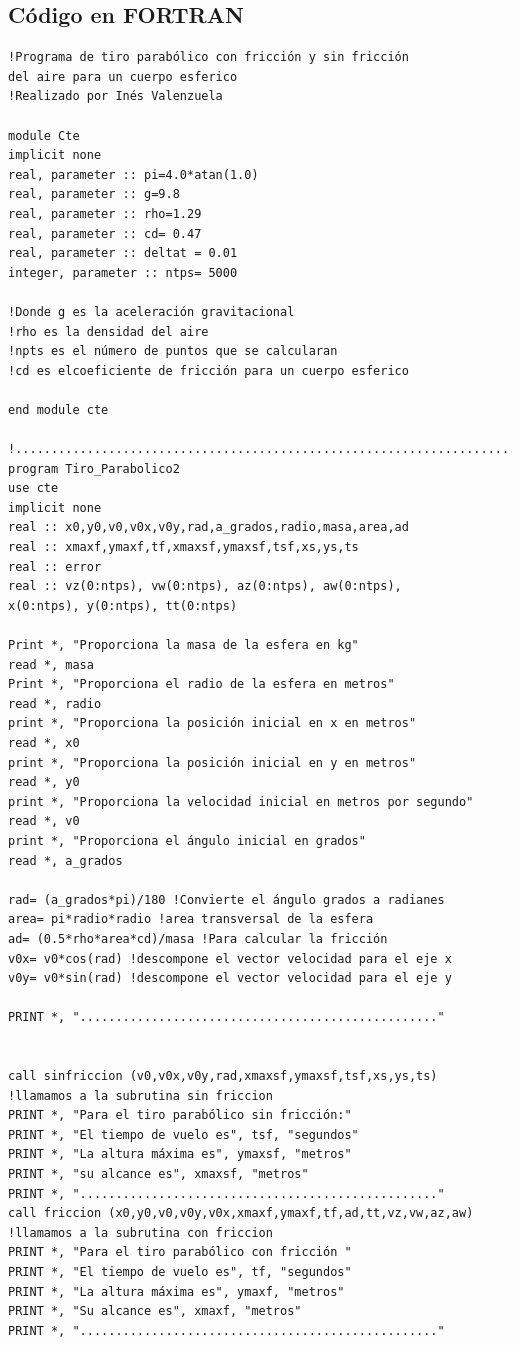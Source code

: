 \documentclass[a4paper]{article}
\begin{document}
\subsection{Código en FORTRAN}

\begin{verbatim}
!Programa de tiro parabólico con fricción y sin fricción 
del aire para un cuerpo esferico
!Realizado por Inés Valenzuela

module Cte
implicit none
real, parameter :: pi=4.0*atan(1.0)
real, parameter :: g=9.8
real, parameter :: rho=1.29
real, parameter :: cd= 0.47
real, parameter :: deltat = 0.01
integer, parameter :: ntps= 5000

!Donde g es la aceleración gravitacional
!rho es la densidad del aire
!npts es el número de puntos que se calcularan
!cd es elcoeficiente de fricción para un cuerpo esferico

end module cte

!..............................................................................
program Tiro_Parabolico2
use cte
implicit none
real :: x0,y0,v0,v0x,v0y,rad,a_grados,radio,masa,area,ad
real :: xmaxf,ymaxf,tf,xmaxsf,ymaxsf,tsf,xs,ys,ts
real :: error 
real :: vz(0:ntps), vw(0:ntps), az(0:ntps), aw(0:ntps),
x(0:ntps), y(0:ntps), tt(0:ntps)

Print *, "Proporciona la masa de la esfera en kg"
read *, masa
Print *, "Proporciona el radio de la esfera en metros"
read *, radio
print *, "Proporciona la posición inicial en x en metros"
read *, x0
print *, "Proporciona la posición inicial en y en metros"
read *, y0
print *, "Proporciona la velocidad inicial en metros por segundo"
read *, v0
print *, "Proporciona el ángulo inicial en grados"
read *, a_grados

rad= (a_grados*pi)/180 !Convierte el ángulo grados a radianes
area= pi*radio*radio !area transversal de la esfera
ad= (0.5*rho*area*cd)/masa !Para calcular la fricción
v0x= v0*cos(rad) !descompone el vector velocidad para el eje x
v0y= v0*sin(rad) !descompone el vector velocidad para el eje y

PRINT *, ".................................................."


call sinfriccion (v0,v0x,v0y,rad,xmaxsf,ymaxsf,tsf,xs,ys,ts)
!llamamos a la subrutina sin friccion
PRINT *, "Para el tiro parabólico sin fricción:"
PRINT *, "El tiempo de vuelo es", tsf, "segundos"
PRINT *, "La altura máxima es", ymaxsf, "metros"
PRINT *, "su alcance es", xmaxsf, "metros"
PRINT *, ".................................................."
call friccion (x0,y0,v0,v0y,v0x,xmaxf,ymaxf,tf,ad,tt,vz,vw,az,aw)
!llamamos a la subrutina con friccion
PRINT *, "Para el tiro parabólico con fricción "
PRINT *, "El tiempo de vuelo es", tf, "segundos"
PRINT *, "La altura máxima es", ymaxf, "metros"
PRINT *, "Su alcance es", xmaxf, "metros"
PRINT *, ".................................................."


\end{verbatim}
\end{document}
